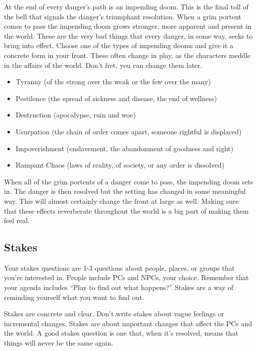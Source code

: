 At the end of every danger's path is an impending doom. This is the final toll of the bell that signals the danger's triumphant resolution. When a grim portent comes to pass the impending doom grows stronger, more apparent and present in the world. These are the very bad things that every danger, in some way, seeks to bring into effect. Choose one of the types of impending dooms and give it a concrete form in your front. These often change in play, as the characters meddle in the affairs of the world. Don't fret, you can change them later.
\begin{itemize}
\item Tyranny (of the strong over the weak or the few over the many)
\item Pestilence (the spread of sickness and disease, the end of wellness)
\item Destruction (apocalypse, ruin and woe)
\item Usurpation (the chain of order comes apart, someone rightful is displaced)
\item Impoverishment (enslavement, the abandonment of goodness and right)
\item Rampant Chaos (laws of reality, of society, or any order is dissolved)

\end{itemize}


When all of the grim portents of a danger come to pass, the impending doom sets in. The danger is then resolved but the setting has changed in some meaningful way. This will almost certainly change the front at large as well. Making sure that these effects reverberate throughout the world is a big part of making them feel real.
\subsection{Stakes}

Your stakes questions are 1-3 questions about people, places, or groups that you're interested in. People include PCs and NPCs, your choice. Remember that your agenda includes ``Play to find out what happens?'' Stakes are a way of reminding yourself what you want to find out.


Stakes are concrete and clear. Don't write stakes about vague feelings or incremental changes. Stakes are about important changes that affect the PCs and the world. A good stakes question is one that, when it's resolved, means that things will never be the same again.


